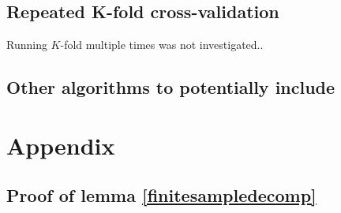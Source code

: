 \documentclass[11pt, a4paper]{article}
\theoremstyle{definition}
\theoremstyle{remark}
\begin{document}
\subsection{Repeated K-fold cross-validation}
Running $ K $-fold multiple times was not investigated..


\subsection{Other algorithms to potentially include}

\newpage

\section{Appendix}
\subsection{Proof of lemma \ref{finitesampledecomp}}
\end{document}
